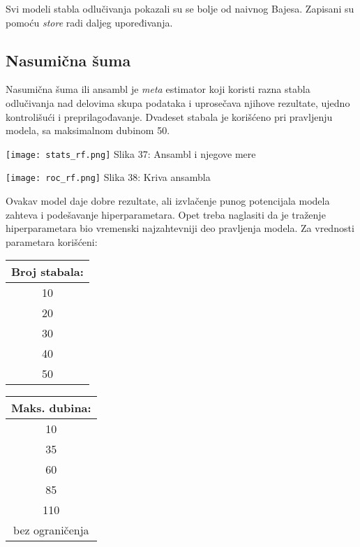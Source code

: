 \documentclass[a4paper]{article}
\begin{document}
{Svi modeli stabla odlučivanja pokazali su se bolje od naivnog Bajesa. Zapisani su pomoću {\em store} radi daljeg upoređivanja.

\subsection{Nasumična šuma}
\label{rf}

Nasumična šuma ili ansambl je {\em meta} estimator koji koristi razna stabla odlučivanja nad delovima skupa podataka i uprosečava njihove rezultate, ujedno kontrolišući i preprilagođavanje. Dvadeset stabala je korišćeno pri pravljenju modela, sa maksimalnom dubinom 50.

\noindent\begin{minipage}{0.4\textwidth}
\texttt{[image: stats\_rf.png]}
Slika 37: Ansambl i njegove mere\\
\end{minipage}
\begin{minipage}{0.6\textwidth}
\texttt{[image: roc\_rf.png]}
\hphantom{aaaaaaaaaaaaa}Slika 38: Kriva ansambla\\
\end{minipage}

Ovakav model daje dobre rezultate, ali izvlačenje punog potencijala modela zahteva i podešavanje hiperparametara. Opet treba naglasiti da je traženje hiperparametara bio vremenski najzahtevniji deo pravljenja modela. Za vrednosti parametara korišćeni:

\begin{center}
\hphantom{aaaaaaa}
\begin{tabular}{|c|} \hline
Broj stabala:\\ \hline \hline
10\\ \hline
20\\ \hline
30\\ \hline
40\\ \hline
50\\ \hline
\end{tabular}
\hphantom{aaa}
\begin{tabular}{|c|} \hline
Maks. dubina:\\ \hline \hline
10\\ \hline
35\\ \hline
60\\ \hline
85\\ \hline
110\\ \hline
bez ograničenja\\ \hline
\end{tabular}
\end{center}

}
\end{document}
